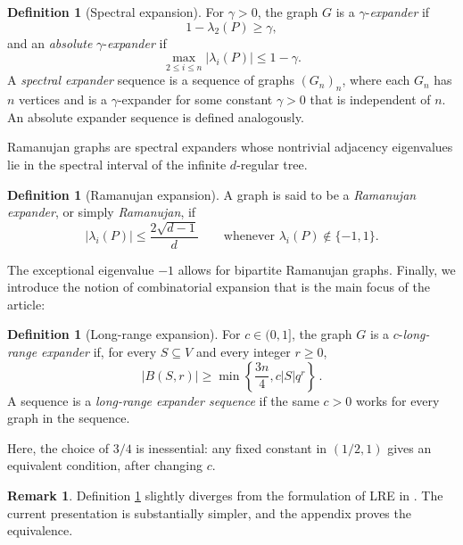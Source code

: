 \documentclass[11pt,reqno]{amsart}
\theoremstyle{definition}
\newtheorem{remark}[theorem]{Remark}
\newtheorem{definition}[theorem]{Definition}
\begin{document}
\begin{definition}[Spectral expansion]\label{def:spectral}
For $\gamma>0$, the graph $G$ is a $\gamma$-\emph{expander}
if
\[
 1-\lambda_2(P)\ge\gamma,
\]
and an \emph{absolute} $\gamma$-\emph{expander} if
\[
 \max_{2\le i\le n}|\lambda_i(P)|\le1-\gamma.
\]
A \textit{spectral expander} sequence is a sequence of graphs $(G_n)_n$, where each $G_n$ has $n$ vertices and is a $\gamma$-expander for some constant $\gamma > 0$ that is independent of $n$. An absolute expander sequence is defined analogously.
\end{definition}

Ramanujan graphs are spectral expanders whose nontrivial adjacency eigenvalues lie in the spectral interval of the infinite $d$-regular tree.

\begin{definition}[Ramanujan expansion]
A graph is said to be a \emph{Ramanujan expander}, or simply
\emph{Ramanujan}, if
\[
 |\lambda_i(P)|\le\frac{2\sqrt{d-1}}d
 \qquad\text{whenever }\lambda_i(P)\notin\{-1,1\}.
\]
\end{definition}

The exceptional eigenvalue $-1$ allows for bipartite Ramanujan graphs.
Finally, we introduce the notion of combinatorial expansion that is the main focus of the article:

\begin{definition}[Long-range expansion]\label{def:lre}
For $c\in(0,1]$, the graph $G$ is a $c$-\emph{long-range expander} if, for every $S\subseteq V$ and every integer $r\ge0$,
\begin{equation}\label{eq:lre}
 |B(S,r)|\ge\min\left\{\frac{3n}{4},c|S|q^r\right\}\,.
\end{equation}
A sequence is a \emph{long-range expander sequence} if the same $c>0$
works for every graph in the sequence.
\end{definition}

Here, the choice of $3/4$ is inessential: any fixed constant in $(1/2,1)$ gives an equivalent condition, after changing $c$.

\begin{remark}
    Definition \ref{def:lre} slightly diverges from the formulation of LRE in \cite{ADTT}. The current presentation is substantially simpler, and the appendix proves the equivalence.
\end{remark}
\end{document}
